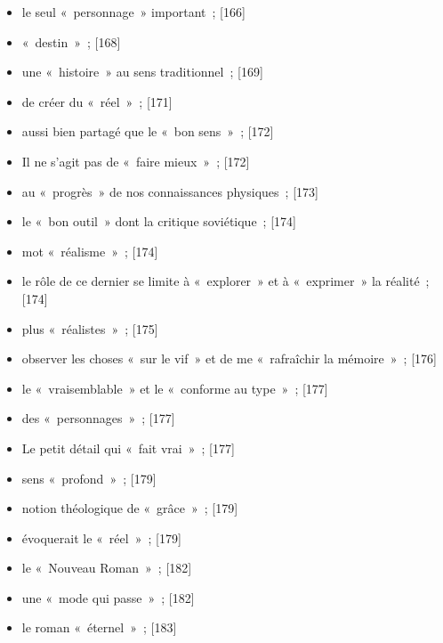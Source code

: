 \documentclass[12pt, a4paper]{article}
\begin{document}
\begin{itemize}
    \item le seul «~personnage~» important{\color{gray}~; [166]}

    \item «~destin~»{\color{gray}~; [168]}

    \item une «~histoire~» au sens traditionnel{\color{gray}~; [169]}

    \item de créer du «~réel~»{\color{gray}~; [171]}

    \item aussi bien partagé que le «~bon sens~»{\color{gray}~; [172]}

    \item Il ne s’agit pas de «~faire mieux~»{\color{gray}~; [172]}

    \item au «~progrès~» de nos connaissances physiques{\color{gray}~; [173]}

    \item le «~bon outil~» dont la critique soviétique{\color{gray}~; [174]}

    \item mot «~réalisme~»{\color{gray}~; [174]}

    \item le rôle de ce dernier se limite à «~explorer~» et à «~exprimer~» la réalité{\color{gray}~; [174]}

    \item plus «~réalistes~»{\color{gray}~; [175]}

    \item observer les choses «~sur le vif~» et de me «~rafraîchir la mémoire~»{\color{gray}~; [176]}

    \item le «~vraisemblable~» et le «~conforme au type~»{\color{gray}~; [177]}

    \item des «~personnages~»{\color{gray}~; [177]}

    \item Le petit détail qui «~fait vrai~»{\color{gray}~; [177]}

    \item sens «~profond~»{\color{gray}~; [179]}

    \item notion théologique de «~grâce~»{\color{gray}~; [179]}

    \item évoquerait le «~réel~»{\color{gray}~; [179]}

    \item le «~Nouveau Roman~»{\color{gray}~; [182]}

    \item une «~mode qui passe~»{\color{gray}~; [182]}

    \item le roman «~éternel~»{\color{gray}~; [183]}
\end{itemize}
\end{document}
